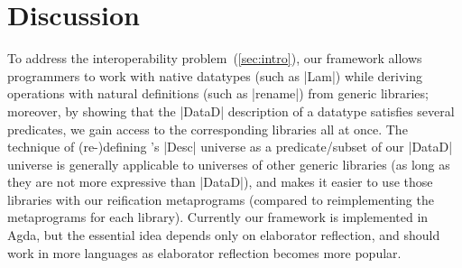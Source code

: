 \documentclass[sigplan,review,fleqn]{acmart}
\renewcommand{\verb}{\collectverb{\color{AgdaFunction}}}
\begin{document}


\section{Discussion}
\label{sec:discussion}

To address the interoperability problem~(\cref{sec:intro}), our framework allows programmers to work with native datatypes (such as \verb|Lam|) while deriving operations with natural definitions (such as \verb|rename|) from generic libraries; moreover, by showing that the \verb|DataD| description of a datatype satisfies several predicates, we gain access to the corresponding libraries all at once.
The technique of (re-)defining \citeauthor{Allais-generic-syntax}'s \verb|Desc| universe as a predicate/subset of our \verb|DataD| universe is generally applicable to universes of other generic libraries (as long as they are not more expressive than \verb|DataD|), and makes it easier to use those libraries with our reification metaprograms (compared to reimplementing the metaprograms for each library).
Currently our framework is implemented in Agda, but the essential idea depends only on elaborator reflection, and should work in more languages as elaborator reflection becomes more popular.

\end{document}

